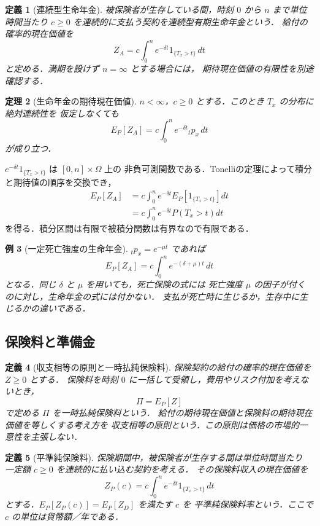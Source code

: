 \documentclass[a5paper,10pt,onecolumn]{jsarticle}
\makeatletter
\theoremstyle{mathnotetheorem}
\newtheorem{theorem}{定理}[section]
\newtheorem{definition}[theorem]{定義}
\newtheorem{example}[theorem]{例}
\renewcommand{\proofname}{証明}
\renewenvironment{proof}[1][\proofname]{%
  \par\pushQED{\qed}\normalfont\topsep4\p@\@plus2\p@\relax
  \trivlist\item[\hskip\labelsep\bfseries #1]\ignorespaces
}{\popQED\endtrivlist\@endpefalse}
\makeatother
\begin{document}
\begin{definition}[連続型生命年金]
被保険者が生存している間，時刻 $0$ から $n$ まで単位時間当たり
$c\ge0$ を連続的に支払う契約を\emph{連続型有期生命年金}という．
給付の確率的現在価値を
\[
 Z_A=c\int_0^n e^{-\delta t}1_{\{T_x>t\}}\,dt
\]
と定める．満期を設けず $n=\infty$ とする場合には，
期待現在価値の有限性を別途確認する．
\end{definition}

\begin{theorem}[生命年金の期待現在価値]\label{thm:annuitylife}
$n<\infty$，$c\ge0$ とする．このとき $T_x$ の分布に絶対連続性を
仮定しなくても
\[
 E_P[Z_A]=c\int_0^n e^{-\delta t}{}_tp_x\,dt
\]
が成り立つ．
\end{theorem}
\begin{proof}
$e^{-\delta t}1_{\{T_x>t\}}$ は $[0,n]\times\Omega$ 上の
非負可測関数である．Tonelliの定理によって積分と期待値の順序を交換でき，
\begin{align*}
 E_P[Z_A]
 &=c\int_0^n e^{-\delta t}E_P[1_{\{T_x>t\}}]dt\\
 &=c\int_0^n e^{-\delta t}P(T_x>t)dt
\end{align*}
を得る．積分区間は有限で被積分関数は有界なので有限である．\end{proof}

\begin{example}[一定死亡強度の生命年金]
${}_tp_x=e^{-\mu t}$ であれば
\[
 E_P[Z_A]=c\int_0^n e^{-(\delta+\mu)t}\,dt
\]
となる．同じ $\delta$ と $\mu$ を用いても，死亡保険の式には
死亡強度 $\mu$ の因子が付くのに対し，生命年金の式には付かない．
支払が死亡時に生じるか，生存中に生じるかの違いである．
\end{example}

\subsection{保険料と準備金}

\begin{definition}[収支相等の原則と一時払純保険料]
保険契約の給付の確率的現在価値を $Z\ge0$ とする．
保険料を時刻 $0$ に一括して受領し，費用やリスク付加を考えないとき，
\[
 \Pi=E_P[Z]
\]
で定める $\Pi$ を\emph{一時払純保険料}という．
給付の期待現在価値と保険料の期待現在価値を等しくする考え方を
\emph{収支相等の原則}という．この原則は価格の市場的一意性を主張しない．
\end{definition}

\begin{definition}[平準純保険料]
保険期間中，被保険者が生存する間は単位時間当たり
一定額 $c\ge0$ を連続的に払い込む契約を考える．
その保険料収入の現在価値を
\[
 Z_P(c)=c\int_0^n e^{-\delta t}1_{\{T_x>t\}}\,dt
\]
とする．$E_P[Z_P(c)]=E_P[Z_D]$ を満たす $c$ を
\emph{平準純保険料率}という．ここで $c$ の単位は貨幣額／年である．
\end{definition}
\end{document}

